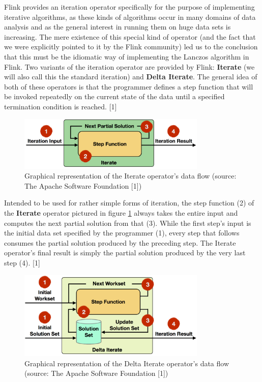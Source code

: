 Flink provides an iteration operator specifically for the purpose of implementing
iterative algorithms, as these kinds of algorithms occur in many domains of data
analysis and as the general interest in running them on huge data sets is increasing.
The mere existence of this special kind of operator (and the fact that we were explicitly
pointed to it by the Flink community) led us to the conclusion that this must be the
idiomatic way of implementing the Lanczos algorithm in Flink. Two variants of the
iteration operator are provided by Flink: \textbf{Iterate} (we will also call this the
standard iteration) and \textbf{Delta Iterate}. The general idea of both of these operators
is that the programmer defines a step function that will be invoked repeatedly on the
current state of the data until a specified termination condition is reached. [1]

\begin{figure}[h]
	\centering
	\includegraphics[width=0.8\textwidth]{images/iterations_iterate_operator}
	\caption{Graphical representation of the Iterate operator's data flow (source: 
	The Apache Software Foundation [1])}
	\label{fig:iterate_operator}
\end{figure}

Intended to be used for rather simple forms of iteration, the step function (2) of the 
\textbf{Iterate} operator pictured in figure \ref{fig:iterate_operator} always takes the 
entire input and computes the next partial solution from that (3). While the first step's input 
is the initial data set specified by the programmer (1), every step that follows consumes the 
partial solution produced by the preceding step. The Iterate operator's final result is simply 
the partial solution produced by the very last step (4). [1]

\begin{figure}[h]
	\centering
	\includegraphics[width=0.8\textwidth]{images/iterations_delta_iterate_operator}
	\caption{Graphical representation of the Delta Iterate operator's data flow (source: 
	The Apache Software Foundation [1])}
	\label{fig:delta_iterate_operator}
\end{figure}

